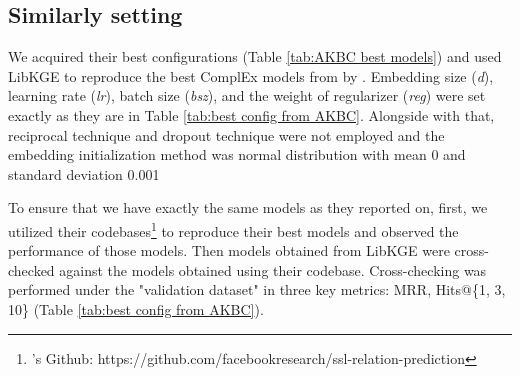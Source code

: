 \subsection{Similarly setting}
\label{sec:Similarly setting}
We acquired their best configurations (Table \ref{tab:AKBC best models}) and used LibKGE to reproduce the best ComplEx models from by \citet{chen2021relation}. Embedding size (\textit{d}), learning rate (\textit{lr}), batch size (\textit{bsz}), and the weight of regularizer (\textit{reg}) were set exactly as they are in Table \ref{tab:best config from AKBC}. Alongside with that, reciprocal technique and dropout technique were not employed and the embedding initialization method was normal distribution with mean 0 and standard deviation 0.001 


To ensure that we have exactly the same models as they reported on, first, we utilized their codebases\footnote{\citet{chen2021relation}'s Github: https://github.com/facebookresearch/ssl-relation-prediction} to reproduce their best models and observed the performance of those models. Then models obtained from LibKGE were cross-checked against the models obtained using their codebase. Cross-checking was performed under the "validation dataset" in three key metrics: MRR, Hits@\{1, 3, 10\} (Table \ref{tab:best config from AKBC}).

